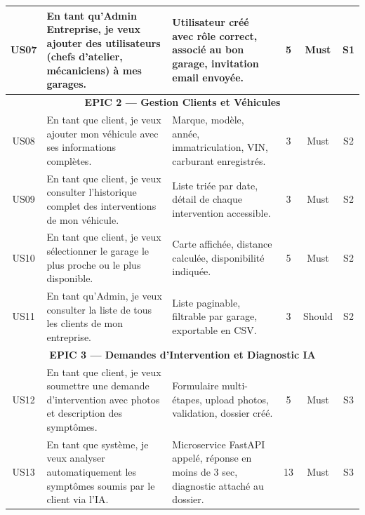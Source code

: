 \documentclass[12pt,a4paper]{report}
\begin{document}
\begin{longtable}{|c|p{4.5cm}|p{5.5cm}|c|c|c|}
US07 &
  En tant qu'Admin Entreprise, je veux ajouter des utilisateurs
  (chefs d'atelier, m\'{e}caniciens) \`{a} mes garages. &
  Utilisateur cr\'{e}\'{e} avec r\^{o}le correct, associ\'{e} au bon
  garage, invitation email envoy\'{e}e. &
  5 & Must & S1 \\
\hline

\multicolumn{6}{|c|}{\cellcolor{primary!30}
  \textbf{EPIC 2 --- Gestion Clients et V\'{e}hicules}} \\
\hline

US08 &
  En tant que client, je veux ajouter mon v\'{e}hicule avec ses
  informations compl\`{e}tes. &
  Marque, mod\`{e}le, ann\'{e}e, immatriculation, VIN, carburant
  enregistr\'{e}s. &
  3 & Must & S2 \\
\hline

US09 &
  En tant que client, je veux consulter l'historique complet des
  interventions de mon v\'{e}hicule. &
  Liste tri\'{e}e par date, d\'{e}tail de chaque intervention
  accessible. &
  3 & Must & S2 \\
\hline

US10 &
  En tant que client, je veux s\'{e}lectionner le garage le plus
  proche ou le plus disponible. &
  Carte affich\'{e}e, distance calcul\'{e}e, disponibilit\'{e}
  indiqu\'{e}e. &
  5 & Must & S2 \\
\hline

US11 &
  En tant qu'Admin, je veux consulter la liste de tous les clients
  de mon entreprise. &
  Liste paginable, filtrable par garage, exportable en CSV. &
  3 & Should & S2 \\
\hline

\multicolumn{6}{|c|}{\cellcolor{primary!30}
  \textbf{EPIC 3 --- Demandes d'Intervention et Diagnostic IA}} \\
\hline

US12 &
  En tant que client, je veux soumettre une demande d'intervention
  avec photos et description des sympt\^{o}mes. &
  Formulaire multi-\'{e}tapes, upload photos, validation,
  dossier cr\'{e}\'{e}. &
  5 & Must & S3 \\
\hline

US13 &
  En tant que syst\`{e}me, je veux analyser automatiquement les
  sympt\^{o}mes soumis par le client via l'IA. &
  Microservice FastAPI appel\'{e}, r\'{e}ponse en moins de 3 sec,
  diagnostic attach\'{e} au dossier. &
  13 & Must & S3 \\
\hline


\end{longtable}
\end{document}
